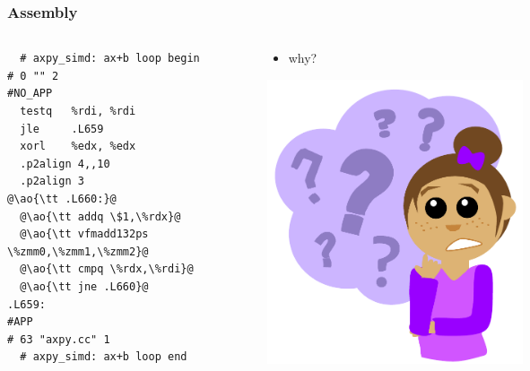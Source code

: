 \documentclass[12pt,dvipdfmx]{beamer}
\newcommand{\ao}[1]{{\color{blue}#1}}
\begin{document}
\iffalse
\begin{frame}[fragile]
\frametitle{Assembly}
\begin{columns}
\begin{column}{0.52\textwidth}
{\small
\begin{lstlisting}
  # axpy_simd: ax+b loop begin
# 0 "" 2
#NO_APP
  testq   %rdi, %rdi
  jle     .L659
  xorl    %edx, %edx
  .p2align 4,,10
  .p2align 3
@\ao{\tt .L660:}@
  @\ao{\tt addq \$1,\%rdx}@
  @\ao{\tt vfmadd132ps \%zmm0,\%zmm1,\%zmm2}@
  @\ao{\tt cmpq \%rdx,\%rdi}@
  @\ao{\tt jne .L660}@
.L659:
#APP
# 63 "axpy.cc" 1
  # axpy_simd: ax+b loop end
\end{lstlisting}} %
\end{column}

\begin{column}{0.48\textwidth}
\begin{itemize}
\item why?
\end{itemize}

\begin{center}
\includegraphics[width=0.5\textwidth]{out/pdf/svg/Question_Girl.pdf}  
\end{center}
\end{column}
\end{columns}
\end{frame}
\end{document}
